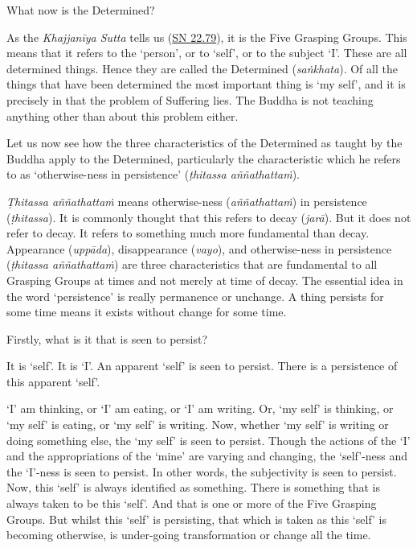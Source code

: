 What now is the Determined?

As the \emph{Khajjanīya Sutta} tells us (\href{https://suttacentral.net/sn22.79/en/bodhi}{SN 22.79}), it is the Five Grasping Groups. This means that it refers to the `person', or to `self', or to the subject `I'. These are all determined things. Hence they are called the Determined (\emph{saṅkhata}). Of all the things that have been determined the most important thing is `my self', and it is precisely in  that the problem of Suffering lies. The Buddha is not teaching anything other than about this problem either.

Let us now see how the three characteristics of the Determined as taught by the Buddha apply to the Determined, particularly the characteristic which he refers to as `otherwise-ness in persistence' (\emph{ṭhitassa aññathattaṁ}).

\emph{Ṭhitassa aññathattaṁ} means otherwise-ness (\emph{aññathattaṁ}) in persistence (\emph{ṭhitassa}). It is commonly thought that this refers to decay (\emph{jarā}). But it does not refer to decay. It refers to something much more fundamental than decay. Appearance (\emph{uppāda}), disappearance (\emph{vayo}), and otherwise-ness in persistence (\emph{ṭhitassa aññathattaṁ}) are three characteristics that are fundamental to all Grasping Groups at  times and not merely at time of decay. The essential idea in the word `persistence' is really permanence or unchange. A thing persists for some time means it exists without change for some time.

Firstly, what is it that is seen to persist?

It is `self'. It is `I'. An apparent `self' is seen to persist. There is a persistence of this apparent `self'.

`I' am thinking, or `I' am eating, or `I' am writing. Or, `my self' is thinking, or `my self' is eating, or `my self' is writing. Now, whether `my self' is writing or doing something else, the `my self' is seen to persist. Though the actions of the `I' and the appropriations of the `mine' are varying and changing, the `self'-ness and the `I'-ness is seen to persist. In other words, the subjectivity is seen to persist. Now, this `self' is always identified as something. There is something that is always taken to be this `self'. And that is one or more of the Five Grasping Groups. But whilst this `self' is persisting, that which is taken as this `self' is becoming otherwise, is under-going transformation or change all the time.

